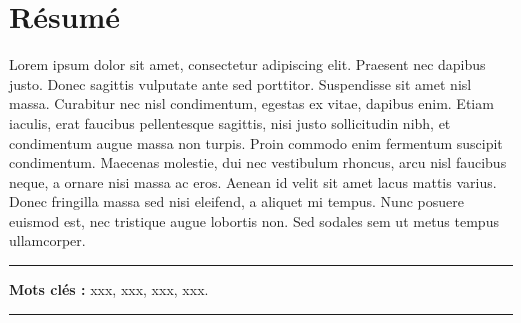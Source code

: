 \chapter*{Résumé}


Lorem ipsum dolor sit amet, consectetur adipiscing elit. Praesent nec dapibus justo. Donec sagittis vulputate ante sed porttitor. Suspendisse sit amet nisl massa. Curabitur nec nisl condimentum, egestas ex vitae, dapibus enim. Etiam iaculis, erat faucibus pellentesque sagittis, nisi justo sollicitudin nibh, et condimentum augue massa non turpis. Proin commodo enim fermentum suscipit condimentum. Maecenas molestie, dui nec vestibulum rhoncus, arcu nisl faucibus neque, a ornare nisi massa ac eros. Aenean id velit sit amet lacus mattis varius. Donec fringilla massa sed nisi eleifend, a aliquet mi tempus. Nunc posuere euismod est, nec tristique augue lobortis non. Sed sodales sem ut metus tempus ullamcorper.

\noindent\rule[2pt]{\textwidth}{0.5pt}

{\textbf{Mots clés :}}
xxx, xxx, xxx, xxx.
\\
\noindent\rule[2pt]{\textwidth}{0.5pt}
